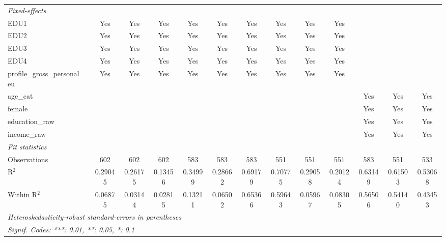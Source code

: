 \begin{tabular}{lcccccccccccc}
   \midrule
   \emph{Fixed-effects}\\
   EDU1                                      & Yes      & Yes           & Yes      & Yes      & Yes      & Yes      & Yes      & Yes      & Yes      &               &              & \\  
   EDU2                                      & Yes      & Yes           & Yes      & Yes      & Yes      & Yes      & Yes      & Yes      & Yes      &               &              & \\  
   EDU3                                      & Yes      & Yes           & Yes      & Yes      & Yes      & Yes      & Yes      & Yes      & Yes      &               &              & \\  
   EDU4                                      & Yes      & Yes           & Yes      & Yes      & Yes      & Yes      & Yes      & Yes      & Yes      &               &              & \\  
   profile\_gross\_personal\_eu              & Yes      & Yes           & Yes      & Yes      & Yes      & Yes      & Yes      & Yes      & Yes      &               &              & \\  
   age\_cat                                  &          &               &          &          &          &          &          &          &          & Yes           & Yes          & Yes\\  
   female                                    &          &               &          &          &          &          &          &          &          & Yes           & Yes          & Yes\\  
   education\_raw                            &          &               &          &          &          &          &          &          &          & Yes           & Yes          & Yes\\  
   income\_raw                               &          &               &          &          &          &          &          &          &          & Yes           & Yes          & Yes\\  
   \midrule
   \emph{Fit statistics}\\
   Observations                              & 602      & 602           & 602      & 583      & 583      & 583      & 551      & 551      & 551      & 583           & 551          & 533\\  
   R$^2$                                     & 0.29045  & 0.26175       & 0.13456  & 0.34999  & 0.28662  & 0.69179  & 0.70775  & 0.29058  & 0.20124  & 0.63149       & 0.61503      & 0.53068\\  
   Within R$^2$                              & 0.06875  & 0.03144       & 0.02815  & 0.13211  & 0.06502  & 0.65366  & 0.59643  & 0.05967  & 0.08305  & 0.56506       & 0.54140      & 0.43453\\  
   \midrule \midrule
   \multicolumn{13}{l}{\emph{Heteroskedasticity-robust standard-errors in parentheses}}\\
   \multicolumn{13}{l}{\emph{Signif. Codes: ***: 0.01, **: 0.05, *: 0.1}}\\
\end{tabular}
\par\endgroup


